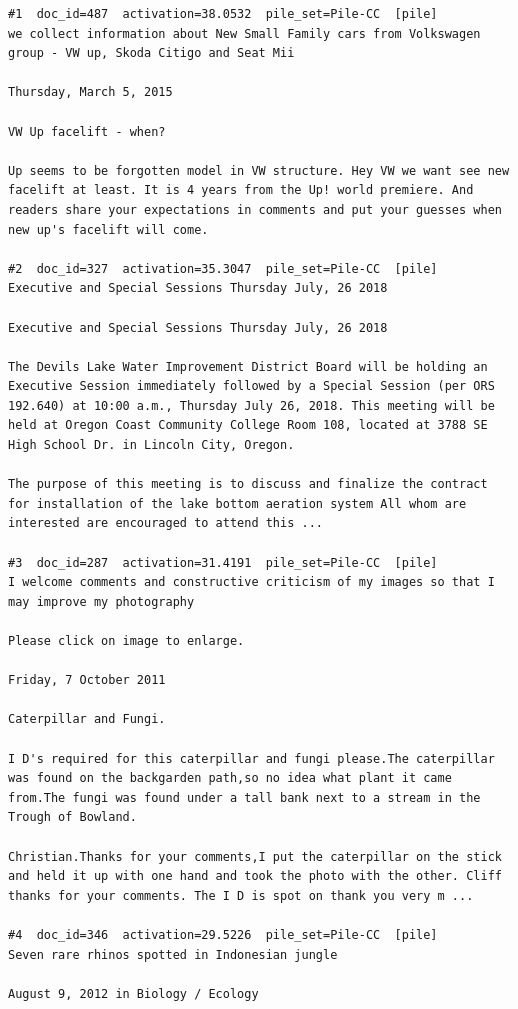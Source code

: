 \begin{verbatim}
#1  doc_id=487  activation=38.0532  pile_set=Pile-CC  [pile]
we collect information about New Small Family cars from Volkswagen group - VW up, Skoda Citigo and Seat Mii

Thursday, March 5, 2015

VW Up facelift - when?

Up seems to be forgotten model in VW structure. Hey VW we want see new facelift at least. It is 4 years from the Up! world premiere. And readers share your expectations in comments and put your guesses when new up's facelift will come.

#2  doc_id=327  activation=35.3047  pile_set=Pile-CC  [pile]
Executive and Special Sessions Thursday July, 26 2018

Executive and Special Sessions Thursday July, 26 2018

The Devils Lake Water Improvement District Board will be holding an Executive Session immediately followed by a Special Session (per ORS 192.640) at 10:00 a.m., Thursday July 26, 2018. This meeting will be held at Oregon Coast Community College Room 108, located at 3788 SE High School Dr. in Lincoln City, Oregon.

The purpose of this meeting is to discuss and finalize the contract for installation of the lake bottom aeration system All whom are interested are encouraged to attend this ...

#3  doc_id=287  activation=31.4191  pile_set=Pile-CC  [pile]
I welcome comments and constructive criticism of my images so that I may improve my photography

Please click on image to enlarge.

Friday, 7 October 2011

Caterpillar and Fungi.

I D's required for this caterpillar and fungi please.The caterpillar was found on the backgarden path,so no idea what plant it came from.The fungi was found under a tall bank next to a stream in the Trough of Bowland.

Christian.Thanks for your comments,I put the caterpillar on the stick and held it up with one hand and took the photo with the other. Cliff thanks for your comments. The I D is spot on thank you very m ...

#4  doc_id=346  activation=29.5226  pile_set=Pile-CC  [pile]
Seven rare rhinos spotted in Indonesian jungle

August 9, 2012 in Biology / Ecology


\end{verbatim}
